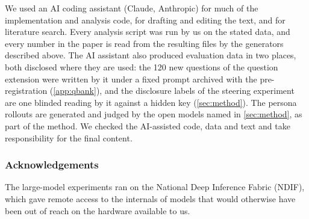 We used an AI coding assistant (Claude, Anthropic) for much of the implementation and analysis code, for
drafting and editing the text, and for literature search. Every analysis script was run by us on the stated
data, and every number in the paper is read from the resulting files by the generators described above. The
AI assistant also produced evaluation data in two places, both disclosed where they are used: the 120 new
questions of the question extension were written by it under a fixed prompt archived with the
pre-registration (\cref{app:qbank}), and the disclosure labels of the steering experiment are one blinded
reading by it against a hidden key (\cref{sec:method}). The
persona rollouts are generated and judged by the open models named in \cref{sec:method}, as part of the
method. We checked the AI-assisted code, data and text and take responsibility for the final content.

\ifanonymous\else
\subsubsection*{Acknowledgements}

The large-model experiments ran on the National Deep Inference Fabric (NDIF), which gave remote access to
the internals of models that would otherwise have been out of reach on the hardware available to us.
\fi

